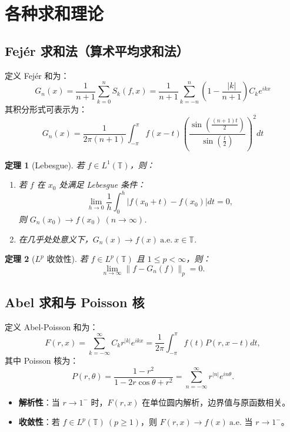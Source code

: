 \documentclass[12pt]{article}
\newtheorem{theorem}{定理}  %
\begin{document}
	\section{各种求和理论}
	
	\subsection{Fejér 求和法（算术平均求和法）}
	定义 Fejér 和为：
	\[
	G_n(x) = \frac{1}{n+1} \sum_{k=0}^n S_k(f,x) = \frac{1}{n+1} \sum_{k=-n}^n \left( 1 - \frac{|k|}{n+1} \right) C_k e^{ikx}
	\]
	其积分形式可表示为：
	\[
	G_n(x) = \frac{1}{2\pi(n+1)} \int_{-\pi}^{\pi} f(x-t) \left( \frac{\sin\left( \frac{(n+1)t}{2} \right)}{\sin\left( \frac{t}{2} \right)} \right)^2 dt
	\]
	
	\begin{theorem}[Lebesgue]
		若 $f \in L^1(\mathbb{T})$，则：
		\begin{enumerate}[leftmargin=2cm]
			\item 若 $f$ 在 $x_0$ 处满足 Lebesgue 条件：
			\[
			\lim_{h \to 0} \frac{1}{h} \int_0^h |f(x_0 + t) - f(x_0)| dt = 0,
			\]
			则 $G_n(x_0) \to f(x_0) \ (n \to \infty)$.
			
			\item 在几乎处处意义下，$G_n(x) \to f(x) \ \text{a.e.} \ x \in \mathbb{T}$.
		\end{enumerate}
	\end{theorem}
	
	\begin{theorem}[$L^p$ 收敛性]
		若 $f \in L^p(\mathbb{T})$ 且 $1 \leq p < \infty$，则：
		\[
		\lim_{n \to \infty} \| f - G_n(f) \|_p = 0.
		\]
	\end{theorem}
	
	\subsection{Abel 求和与 Poisson 核}
	定义 Abel-Poisson 和为：
	\[
	F(r,x) = \sum_{k=-\infty}^{\infty} C_k r^{|k|} e^{ikx} = \frac{1}{2\pi} \int_{-\pi}^{\pi} f(t) P(r, x-t) dt,
	\]
	其中 Poisson 核为：
	\[
	P(r, \theta) = \frac{1 - r^2}{1 - 2r\cos\theta + r^2} = \sum_{n=-\infty}^\infty r^{|n|} e^{in\theta}.
	\]
	
	\begin{itemize}
		\item \textbf{解析性}：当 $r \to 1^-$ 时，$F(r,x)$ 在单位圆内解析，边界值与原函数相关。
		\item \textbf{收敛性}：若 $f \in L^p(\mathbb{T}) \ (p \geq 1)$，则 $F(r,x) \to f(x) \ \text{a.e.}$ 当 $r \to 1^-$。
	\end{itemize}
	
\end{document}
